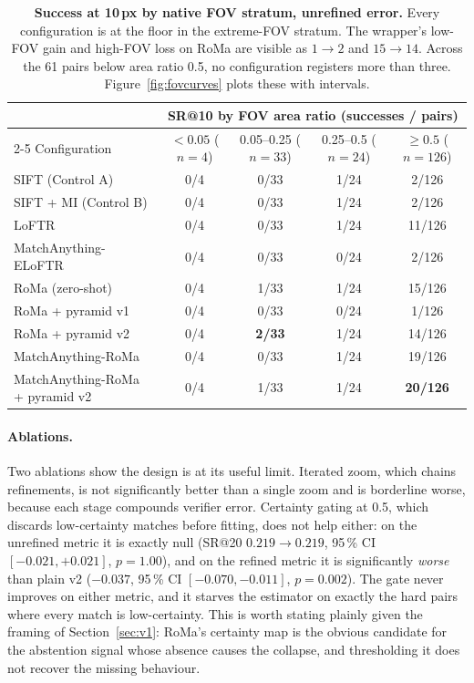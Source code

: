 \documentclass[10pt]{article}
\begin{document}
\begin{table}[t]
\centering
\small
\begin{tabular}{lcccc}
\toprule
& \multicolumn{4}{c}{SR@10 by FOV area ratio (successes / pairs)} \\
\cmidrule(lr){2-5}
Configuration & ${<}0.05$ ($n{=}4$) & 0.05--0.25 ($n{=}33$) & 0.25--0.5 ($n{=}24$) & ${\ge}0.5$ ($n{=}126$) \\
\midrule
SIFT (Control A)                & 0/4 & 0/33 & 1/24 & \phantom{0}2/126 \\
SIFT + MI (Control B)           & 0/4 & 0/33 & 1/24 & \phantom{0}2/126 \\
LoFTR                           & 0/4 & 0/33 & 1/24 & 11/126 \\
MatchAnything-ELoFTR            & 0/4 & 0/33 & 0/24 & \phantom{0}2/126 \\
RoMa (zero-shot)                & 0/4 & 1/33 & 1/24 & 15/126 \\
RoMa + pyramid v1               & 0/4 & 0/33 & 0/24 & \phantom{0}1/126 \\
RoMa + pyramid v2               & 0/4 & \textbf{2/33} & 1/24 & 14/126 \\
MatchAnything-RoMa              & 0/4 & 0/33 & 1/24 & 19/126 \\
MatchAnything-RoMa + pyramid v2 & 0/4 & 1/33 & 1/24 & \textbf{20/126} \\
\bottomrule
\end{tabular}
\caption{\textbf{Success at 10\,px by native FOV stratum, unrefined error.} Every configuration is at the floor in the extreme-FOV stratum. The wrapper's low-FOV gain and high-FOV loss on RoMa are visible as $1\rightarrow2$ and $15\rightarrow14$. Across the 61 pairs below area ratio 0.5, no configuration registers more than three. Figure~\ref{fig:fovcurves} plots these with intervals.}
\label{tab:strata}
\end{table}

\paragraph{Ablations.} Two ablations show the design is at its useful limit. Iterated zoom, which chains refinements, is not significantly better than a single zoom and is borderline worse, because each stage compounds verifier error. Certainty gating at 0.5, which discards low-certainty matches before fitting, does not help either: on the unrefined metric it is exactly null (SR@20 $0.219\rightarrow0.219$, 95\,\% CI $[-0.021,+0.021]$, $p=1.00$), and on the refined metric it is significantly \emph{worse} than plain v2 ($-0.037$, 95\,\% CI $[-0.070,-0.011]$, $p=0.002$). The gate never improves on either metric, and it starves the estimator on exactly the hard pairs where every match is low-certainty. This is worth stating plainly given the framing of Section~\ref{sec:v1}: RoMa's certainty map is the obvious candidate for the abstention signal whose absence causes the collapse, and thresholding it does not recover the missing behaviour.
\end{document}
